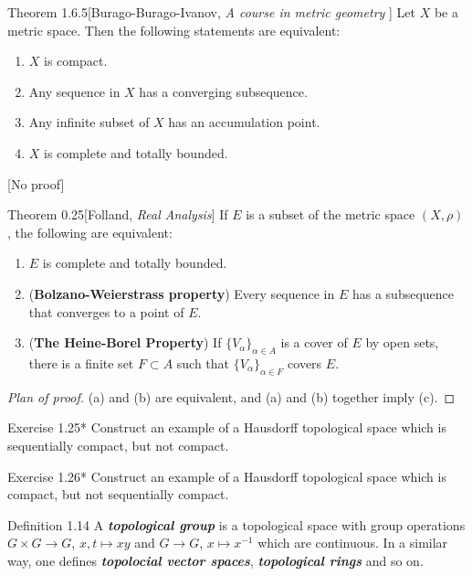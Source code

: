 \begin{thing1}{Theorem 1.6.5}[Burago-Burago-Ivanov, \textit{A course in metric geometry} ]\leavevmode
	Let $X$ be a metric space. Then the following statements are equivalent:
	\begin{enumerate}
	\item $X$ is compact.
	\item Any sequence in $X$ has a converging subsequence.
	\item Any infinite subset of $X$ has an accumulation point.
	\item $X$ is complete and totally bounded.
	\end{enumerate}
	[No proof]
\end{thing1}

\begin{thing1}{Theorem 0.25}[Folland, \textit{Real Analysis}]\leavevmode
	If $E$ is a subset of the metric space $(X,\rho)$, the following are equivalent:
	\begin{enumerate}[label=(\alph*)]
	\item $E$ is complete and totally bounded.
	\item (\textbf{Bolzano-Weierstrass property}) Every sequence in $E$ has a subsequence that converges to a point of $E$.
	\item (\textbf{The Heine-Borel Property}) If $\{V_\alpha\}_{\alpha \in A}$ is a cover of $E$ by open sets, there is a finite set $F \subset A $ such that $\{ V_\alpha\}_{\alpha \in F}$ covers $E$.
	\end{enumerate}
\end{thing1}

\begin{proof}[Plan of proof]\leavevmode
	(a) and (b) are equivalent, and  (a) and (b) together imply (c).
\end{proof}

\begin{thing4}{Exercise 1.25*}\label{exer:1.25}\leavevmode
Construct an example of a Hausdorff topological space which is sequentially compact, but not compact.
\end{thing4}

\begin{thing4}{Exercise 1.26*}\label{exer:1.26}\leavevmode
Construct an example of a Hausdorff topological space which is compact, but not sequentially compact.
\end{thing4}

\begin{thing3}{Definition 1.14}\leavevmode
	A \textit{\textbf{topological group}} is a topological space with group operations $G \times G \longrightarrow G$, $x,t \mapsto xy$ and $G\longrightarrow G$, $x \mapsto  x^{-1}$ which are continuous. In a similar way, one defines \textit{\textbf{topolocial vector spaces}}, \textit{\textbf{topological rings}} and so on.
\end{thing3}

